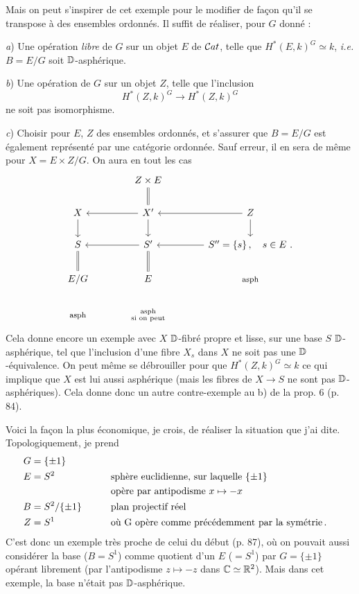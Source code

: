 
Mais on peut s'inspirer de cet exemple pour le modifier de façon qu'il se transpose à des ensembles ordonnés. Il suffit de réaliser, pour $G$ donné :

\textit{a}) Une opération \textit{libre} de $G$ sur un objet $E$ de $\mathcal{C}at$, telle que $H^*(E,k)^G \simeq k$, \textit{i.e.} $B = E/G$ soit $\mathbb{D}$-asphérique.

\textit{b}) Une opération de $G$ sur un objet $Z$, telle que l'inclusion
\[ H^*(Z,k)^G \longrightarrow H^*(Z,k)^G \] %
ne soit pas isomorphisme.

\textit{c}) Choisir pour $E$, $Z$ des ensembles ordonnés, et s'assurer que $B = E/G$ est également représenté par une catégorie ordonnée. Sauf erreur, il en sera de même pour $X = E \times Z/G$. On aura en tout les cas %
\[
\begin{tikzcd}[column sep=large]
 & Z \times E \arrow[d, equal] & \\
X \arrow[d] & X' \arrow[l] \arrow[d] & Z \arrow[l] \arrow[d] \\
S \arrow[d, equal] & S' \arrow[l] \arrow[d, equal] & S'' = \{s\}\, , \quad s \in E \ . \arrow[l] \\
E/G & E & \text{\footnotesize asph} \\
\text{\footnotesize asph} & \substack{\text{asph} \\ \text{si on peut}} &
\end{tikzcd}
\]
Cela donne encore un exemple avec $X$ $\mathbb{D}$-fibré propre et lisse, sur une base $S$ $\mathbb{D}$-asphérique, tel que l'inclusion d'une fibre $X_s$ dans $X$ ne soit pas une $\mathbb{D}$-équivalence. On peut même se débrouiller pour que $H^*(Z,k)^G \simeq k$ ce qui implique
que $X$ est lui aussi asphérique (mais les fibres de $X \to S$ ne sont pas $\mathbb{D}$-asphériques). Cela donne donc un autre contre-exemple au b) de la prop. 6 (p. 84).

Voici la façon la plus économique, je crois, de réaliser la situation que j'ai dite. Topologiquement, je prend %
\[
\begin{aligned}
G &= \{\pm 1\} \\
E &= S^2 &\qquad& \text{sphère euclidienne, sur laquelle } \{\pm 1\} \\
  &      &&      \text{opère par antipodisme } x \mapsto -x \\
B &= S^2/\{\pm 1\} && \text{plan projectif réel} \\
Z &= S^1 && \text{où G opère comme précédemment par la symétrie\,.}
\end{aligned}
\]
C'est donc un exemple très proche de celui du début (p. 87), où on pouvait aussi considérer la base ($B = S^1$) comme quotient d'un $E$ ($= S^1$) par $G = \{\pm 1\}$ opérant librement (par
l'antipodisme $z \mapsto -z$ dans $\mathbb{C} \simeq \mathbb{R}^2$). Mais dans cet exemple, la base n'était pas $\mathbb{D}$-asphérique.

